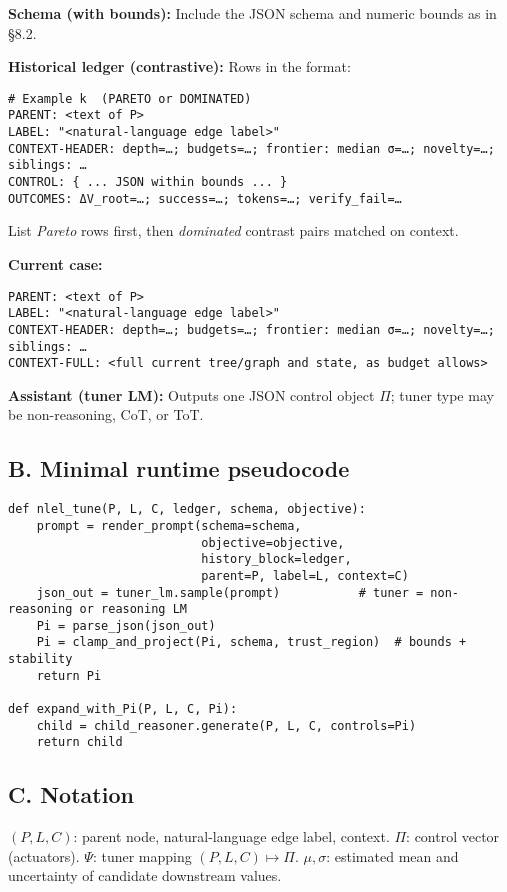 \documentclass[11pt]{article}
\begin{document}
\noindent\textbf{Schema (with bounds):} Include the JSON schema and numeric bounds as in \S8.2.

\noindent\textbf{Historical ledger (contrastive):} Rows in the format:
\begin{verbatim}
# Example k  (PARETO or DOMINATED)
PARENT: <text of P>
LABEL: "<natural-language edge label>"
CONTEXT-HEADER: depth=…; budgets=…; frontier: median σ=…; novelty=…; siblings: …
CONTROL: { ... JSON within bounds ... }
OUTCOMES: ΔV_root=…; success=…; tokens=…; verify_fail=…
\end{verbatim}
List \emph{Pareto} rows first, then \emph{dominated} contrast pairs matched on context.

\noindent\textbf{Current case:}
\begin{verbatim}
PARENT: <text of P>
LABEL: "<natural-language edge label>"
CONTEXT-HEADER: depth=…; budgets=…; frontier: median σ=…; novelty=…; siblings: …
CONTEXT-FULL: <full current tree/graph and state, as budget allows>
\end{verbatim}

\noindent\textbf{Assistant (tuner LM):} Outputs one JSON control object $\Pi$; tuner type may be non-reasoning, CoT, or ToT.

\subsection*{B. Minimal runtime pseudocode}
\begin{verbatim}
def nlel_tune(P, L, C, ledger, schema, objective):
    prompt = render_prompt(schema=schema,
                           objective=objective,
                           history_block=ledger,
                           parent=P, label=L, context=C)
    json_out = tuner_lm.sample(prompt)           # tuner = non-reasoning or reasoning LM
    Pi = parse_json(json_out)
    Pi = clamp_and_project(Pi, schema, trust_region)  # bounds + stability
    return Pi

def expand_with_Pi(P, L, C, Pi):
    child = child_reasoner.generate(P, L, C, controls=Pi)
    return child
\end{verbatim}

\subsection*{C. Notation}
$(P,L,C)$: parent node, natural-language edge label, context. \quad
$\Pi$: control vector (actuators). \quad
$\Psi$: tuner mapping $(P,L,C)\mapsto \Pi$. \quad
$\mu,\sigma$: estimated mean and uncertainty of candidate downstream values.
\end{document}
